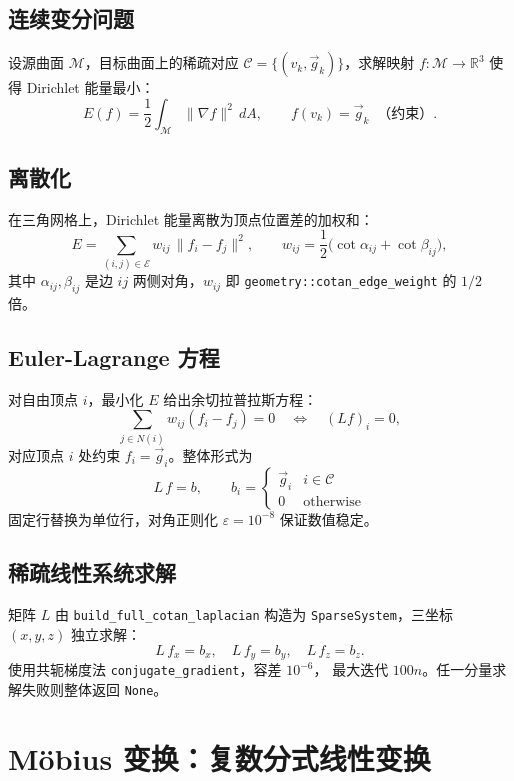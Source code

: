 \documentclass[11pt,a4paper]{article}
\begin{document}
\subsection{连续变分问题}

设源曲面 $\mathcal{M}$，目标曲面上的稀疏对应
$\mathcal{C} = \{(v_k, \vec{g}_k)\}$，求解映射 $f : \mathcal{M} \to \mathbb{R}^3$
使得 Dirichlet 能量最小：
\[
  E(f) = \frac{1}{2} \int_{\mathcal{M}} \|\nabla f\|^2 \, dA,
  \qquad
  f(v_k) = \vec{g}_k \;\; \text{（约束）}.
\]

\subsection{离散化}

在三角网格上，Dirichlet 能量离散为顶点位置差的加权和：
\[
  E = \sum_{(i,j) \in \mathcal{E}} w_{ij} \, \|f_i - f_j\|^2,
  \qquad
  w_{ij} = \frac{1}{2}\bigl(\cot\alpha_{ij} + \cot\beta_{ij}\bigr),
\]
其中 $\alpha_{ij}, \beta_{ij}$ 是边 $ij$ 两侧对角，$w_{ij}$ 即
\texttt{geometry::cotan\_edge\_weight} 的 $1/2$ 倍。

\subsection{Euler-Lagrange 方程}

对自由顶点 $i$，最小化 $E$ 给出余切拉普拉斯方程：
\[
  \sum_{j \in N(i)} w_{ij} (f_i - f_j) = 0
  \quad\Longleftrightarrow\quad
  (L f)_i = 0,
\]
对应顶点 $i$ 处约束 $f_i = \vec{g}_i$。整体形式为
\[
  L \, f = b, \qquad
  b_i = \begin{cases} \vec{g}_i & i \in \mathcal{C} \\ 0 & \text{otherwise} \end{cases}
\]
固定行替换为单位行，对角正则化 $\varepsilon = 10^{-8}$ 保证数值稳定。

\subsection{稀疏线性系统求解}

矩阵 $L$ 由 \texttt{build\_full\_cotan\_laplacian} 构造为
\texttt{SparseSystem}，三坐标 $(x, y, z)$ 独立求解：
\[
  L \, f_x = b_x, \quad L \, f_y = b_y, \quad L \, f_z = b_z.
\]
使用共轭梯度法 \texttt{conjugate\_gradient}，容差 $10^{-6}$，
最大迭代 $100 n$。任一分量求解失败则整体返回 \texttt{None}。

\section{Möbius 变换：复数分式线性变换}
\end{document}
